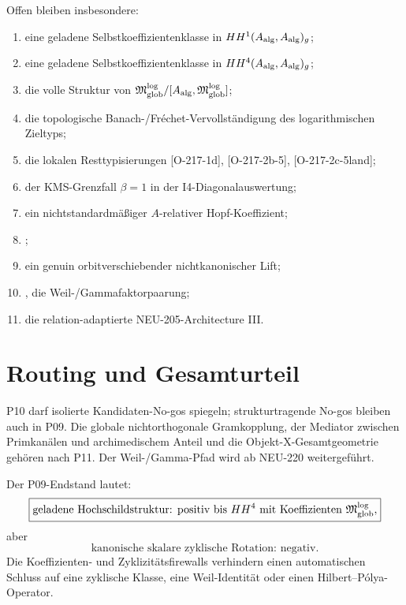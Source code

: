 \documentclass[11pt,a4paper]{article}
\begin{document}
Offen bleiben insbesondere:
\begin{enumerate}[label=\arabic*.]
\item eine geladene Selbstkoeffizientenklasse in $HH^1(A_{\rm alg},A_{\rm alg})_g$;
\item eine geladene Selbstkoeffizientenklasse in $HH^4(A_{\rm alg},A_{\rm alg})_g$;
\item die volle Struktur von $\mathfrak M_{\rm glob}^{\log}/[A_{\rm alg},\mathfrak M_{\rm glob}^{\log}]$;
\item die topologische Banach-/Fréchet-Vervollständigung des logarithmischen Zieltyps;
\item die lokalen Resttypisierungen [O-217-1d], [O-217-2b-5], [O-217-2c-5land];
\item der KMS-Grenzfall $\beta=1$ in der I4-Diagonalauswertung;
\item ein nichtstandardmäßiger $A$-relativer Hopf-Koeffizient;
\item [O-219-cyclic-representative];
\item ein genuin orbitverschiebender nichtkanonischer Lift;
\item [O-219-6], die Weil-/Gammafaktorpaarung;
\item die relation-adaptierte NEU-205-Architecture III.
\end{enumerate}

\section{Routing und Gesamturteil}

P10 darf isolierte Kandidaten-No-gos spiegeln; strukturtragende No-gos bleiben auch in P09. Die globale nichtorthogonale Gramkopplung, der Mediator zwischen Primkanälen und archimedischem Anteil und die Objekt-X-Gesamtgeometrie gehören nach P11. Der Weil-/Gamma-Pfad wird ab NEU-220 weitergeführt.

Der P09-Endstand lautet:
\[
 \boxed{\text{geladene Hochschildstruktur: positiv bis }HH^4
 \text{ mit Koeffizienten }\mathfrak M_{\rm glob}^{\log},}
\]
aber
\[
 \boxed{\text{kanonische skalare zyklische Rotation: negativ.}}
\]
Die Koeffizienten- und Zyklizitätsfirewalls verhindern einen automatischen Schluss auf eine zyklische Klasse, eine Weil-Identität oder einen Hilbert--Pólya-Operator.

\begin{center}
\end{center}
\end{document}
